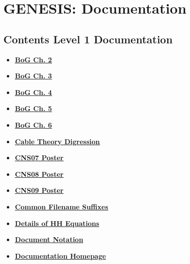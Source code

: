 \documentclass[12pt]{article}
\begin{document}
\section*{GENESIS: Documentation}

\subsection*{Contents Level 1 Documentation}

\begin{itemize}

\item \href{../bog-ch2/bog-ch2.pdf}{\bf \underline{BoG Ch. 2}}

\item \href{../bog-ch3/bog-ch3.pdf}{\bf \underline{BoG Ch. 3}}

\item \href{../bog-ch4/bog-ch4.pdf}{\bf \underline{BoG Ch. 4}}

\item \href{../bog-ch5/bog-ch5.pdf}{\bf \underline{BoG Ch. 5}}

\item \href{../bog-ch6/bog-ch6.pdf}{\bf \underline{BoG Ch. 6}}

\item \href{../cable-theory-digression/cable-theory-digression.pdf}{\bf \underline{Cable Theory Digression}}

\item \href{../CNS07/CNS07.pdf}{\bf \underline{CNS07 Poster}}

\item \href{../CNS08/CNS08.pdf}{\bf \underline{CNS08 Poster}}

\item \href{../CNS09/CNS09.pdf}{\bf \underline{CNS09 Poster}}

\item \href{../common-suffixes/common-suffixes.pdf}{\bf \underline{Common Filename Suffixes}}

\item \href{../hh-model-details/hh-model-details.pdf}{\bf \underline{Details of HH Equations}}

\item \href{../document-notation/document-notation.pdf}{\bf \underline{Document Notation}}

\item \href{../documentation-homepage/documentation-homepage.pdf}{\bf \underline{Documentation Homepage}}


\end{itemize}
\end{document}
